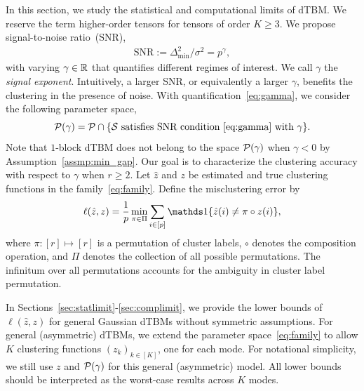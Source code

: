 \documentclass[lettersize,journal]{IEEEtran}
\theoremstyle{definition}
\theoremstyle{definition}
\begin{document}
In this section, we study the statistical and computational limits of dTBM. We reserve the term higher-order tensors for tensors of order $K\geq 3$. We propose signal-to-noise ratio~(SNR),
\begin{align}\label{eq:gamma}
  \text{SNR}:= \Delta^2_{\min}/\sigma^2 = p^{\gamma}, 
\end{align}
with varying $\gamma \in \mathbb{R}$ that quantifies different regimes of interest. We call $\gamma$ the \emph{signal exponent}. Intuitively, a larger SNR, or equivalently a larger $\gamma$, benefits the clustering in the presence of noise. With quantification~\eqref{eq:gamma}, we consider the following parameter space,
\begin{equation}\label{eq:gammafamily}
    \tP(\gamma) = \tP\cap\{\tS \text{ satisfies SNR condition~\eqref{eq:gamma} with $\gamma$} \}.
\end{equation}
Note that $1$-block dTBM does not belong to the space $\mathcal{P}(\gamma)$ when $\gamma < 0$ by Assumption~\ref{assmp:min_gap}. Our goal is to characterize the clustering accuracy with respect to $\gamma$ when $r \geq 2$. Let $\hat z$ and $z$ be estimated and true clustering functions in the family~\eqref{eq:family}. Define the misclustering error by
\[
\ell(\hat z, z)={1\over p}\min_{\pi \in \Pi}\sum_{i\in[p]}\ind\{\hat z(i)\neq \pi \circ z(i)\},
\]
where $\pi: [r] \mapsto [r]$ is a permutation of cluster labels, $\circ$ denotes the composition operation, and $\Pi$ denotes the collection of all possible permutations. The infinitum over all permutations accounts for the ambiguity in cluster label permutation. 

In Sections~\ref{sec:statlimit}-\ref{sec:complimit}, we provide the lower bounds of $\ell (\hat z, z)$ for general Gaussian dTBMs without symmetric assumptions. For general (asymmetric) dTBMs, we extend the parameter space~\eqref{eq:family} to allow $K$ clustering functions $(z_k)_{k\in[K]}$, one for each mode. For notational simplicity, we still use $z$ and $\mathcal{P}(\gamma)$ for this general (asymmetric) model. All lower bounds should be interpreted as the worst-case results across $K$ modes. 

\end{document}
